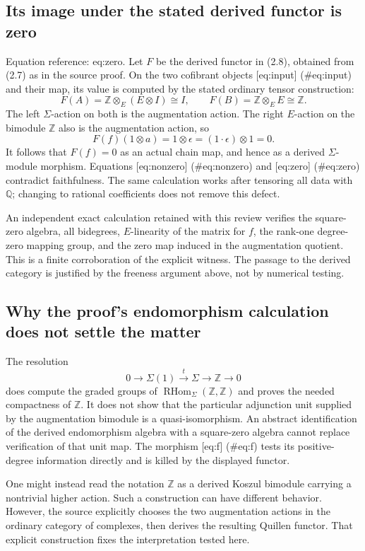\documentclass[10pt]{article}
\begin{document}
\subsection*{Its image under the stated derived functor is zero}
Equation reference: eq:zero. Let \(F\) be the derived functor in (2.8), obtained from (2.7) as in the source proof. On the two cofibrant objects [eq:input] (\#eq:input) and their map, its value is computed by the stated ordinary tensor construction: \[F(A)=\mathbb Z\otimes_E(E\otimes I)\cong I,\qquad
 F(B)=\mathbb Z\otimes_E E\cong\mathbb Z.\] The left \(\Sigma\)-action on both is the augmentation action. The right \(E\)-action on the bimodule \(\mathbb Z\) also is the augmentation action, so \[
 F(f)(1\otimes a)=1\otimes\epsilon
       =(1\cdot\epsilon)\otimes1=0.\] It follows that \(F(f)=0\) as an actual chain map, and hence as a derived \(\Sigma\)-module morphism. Equations [eq:nonzero] (\#eq:nonzero) and [eq:zero] (\#eq:zero) contradict faithfulness. The same calculation works after tensoring all data with \(\mathbb Q\); changing to rational coefficients does not remove this defect.\par
An independent exact calculation retained with this review verifies the square-zero algebra, all bidegrees, \(E\)-linearity of the matrix for \(f\), the rank-one degree-zero mapping group, and the zero map induced in the augmentation quotient. This is a finite corroboration of the explicit witness. The passage to the derived category is justified by the freeness argument above, not by numerical testing.\par
\subsection*{Why the proof’s endomorphism calculation does not settle the matter}
The resolution \[0\longrightarrow\Sigma(1)\xrightarrow{\,t\,}\Sigma\longrightarrow\mathbb Z\longrightarrow0\] does compute the graded groups of \(\operatorname{RHom}_\Sigma(\mathbb Z,\mathbb Z)\) and proves the needed compactness of \(\mathbb Z\). It does not show that the particular adjunction unit supplied by the augmentation bimodule is a quasi-isomorphism. An abstract identification of the derived endomorphism algebra with a square-zero algebra cannot replace verification of that unit map. The morphism [eq:f] (\#eq:f) tests its positive-degree information directly and is killed by the displayed functor.\par
One might instead read the notation \(\mathbb Z\) as a derived Koszul bimodule carrying a nontrivial higher action. Such a construction can have different behavior. However, the source explicitly chooses the two augmentation actions in the ordinary category of complexes, then derives the resulting Quillen functor. That explicit construction fixes the interpretation tested here.\par
\end{document}
